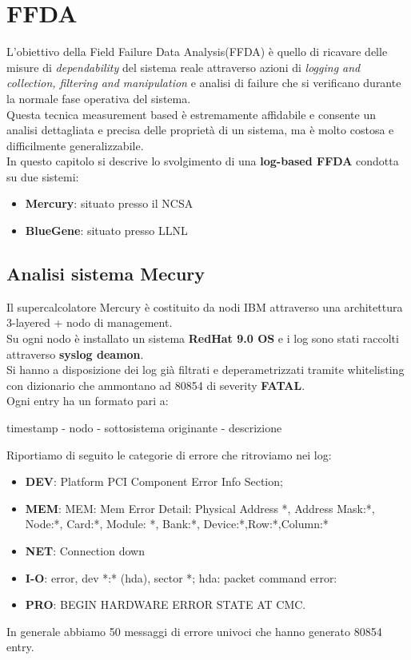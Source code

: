 \chapter{FFDA}
L'obiettivo della Field Failure Data Analysis(FFDA) è quello di ricavare delle misure di \textit{dependability} del sistema reale attraverso azioni di \textit{logging and collection, filtering and manipulation} e analisi di failure che si verificano durante la normale fase operativa del sistema.\\
Questa tecnica measurement based è estremamente affidabile e consente un analisi dettagliata e precisa delle proprietà di un sistema, ma è molto costosa e difficilmente generalizzabile.\\
In questo capitolo si descrive lo svolgimento di una \textbf{log-based FFDA} condotta su due sistemi:
\begin{itemize}
\item \textbf{Mercury}: situato presso il NCSA
\item \textbf{BlueGene}: situato presso LLNL
\end{itemize}
\section{Analisi sistema Mecury}
Il supercalcolatore Mercury è costituito da nodi IBM attraverso una architettura 3-layered + nodo di management.\\
Su ogni nodo è installato un sistema \textbf{RedHat 9.0 OS} e i log sono stati raccolti attraverso \textbf{syslog deamon}.\\
Si hanno a disposizione dei log già filtrati e deperametrizzati tramite whitelisting con dizionario che ammontano ad 80854 di severity \textbf{FATAL}.\\
Ogni entry ha un formato pari a:
\begin{center}
timestamp - nodo - sottosistema originante - descrizione
\end{center}
Riportiamo di seguito le categorie di errore che ritroviamo nei log:
\begin{itemize}
\item \textbf{DEV}:  Platform PCI Component Error Info Section;
\item \textbf{MEM}: MEM: Mem Error Detail: Physical Address *, Address Mask:*, Node:*, Card:*, Module: *, Bank:*, Device:*,Row:*,Column:*
\item \textbf{NET}: Connection down
\item \textbf{I-O}:  error, dev *:* (hda), sector *; hda: packet command error:
\item \textbf{PRO}: BEGIN HARDWARE ERROR STATE AT CMC. 
\end{itemize}
In generale abbiamo 50 messaggi di errore univoci che hanno generato 80854 entry.
